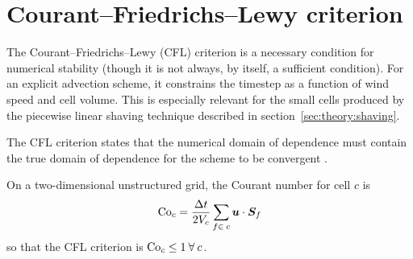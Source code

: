 \section{Courant--Friedrichs--Lewy criterion}
The Courant--Friedrichs--Lewy (CFL) criterion is a necessary condition for numerical stability (though it is not always, by itself, a sufficient condition).  For an explicit advection scheme, it constrains the timestep as a function of wind speed and cell volume.  This is especially relevant for the small cells produced by the piecewise linear shaving technique described in section~\ref{sec:theory:shaving}.

The CFL criterion states that the numerical domain of dependence must contain the true domain of dependence for the scheme to be convergent \autocite{leveque2002}.

On a two-dimensional unstructured grid, the Courant number for cell $c$ is \autocite{weller-shahrokhi2014}
\begin{align}
\mathrm{Co}_c = \frac{\Delta t}{2 V_c} \sum_{f \in\: c} \bm{u} \cdot \bm{S}_f \label{eqn:method:courant}
\end{align}
so that the CFL criterion is $\mathrm{Co}_c \leq 1\:\forall\:c$.


